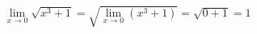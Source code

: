 \begin{ex}
\begin{align}
&\lim_{x\rightarrow 0} \sqrt{x^3+1} = \sqrt{\lim_{x\rightarrow 0} (x^3+1)} = \sqrt{0+1} = 1\nonumber
\end{align}
\end{ex}